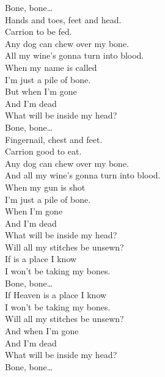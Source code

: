 


Bone, bone… \\

Hands and toes, feet and head. \\
Carrion to be fed. \\
Any dog can chew over my bone. \\
All my wine's gonna turn into blood. \\
When my name is called \\
I'm just a pile of bone. \\

But when I'm gone \\
And I'm dead \\
What will be inside my head? \\

Bone, bone… \\

Fingernail, chest and feet. \\
Carrion good to eat. \\
Any dog can chew over my bone. \\
And all my wine's gonna turn into blood. \\
When my gun is shot \\
I'm just a pile of bone. \\

When I'm gone \\
And I'm dead \\
What will be inside my head? \\
Will all my stitches be unsewn? \\
If  is a place I know \\
I won't be taking my bones. \\

Bone, bone… \\

If Heaven is a place I know \\
I won't be taking my bones. \\
Will all my stitches be unsewn? \\
And when I'm gone \\
And I'm dead \\
What will be inside my head? \\

Bone, bone… \\



